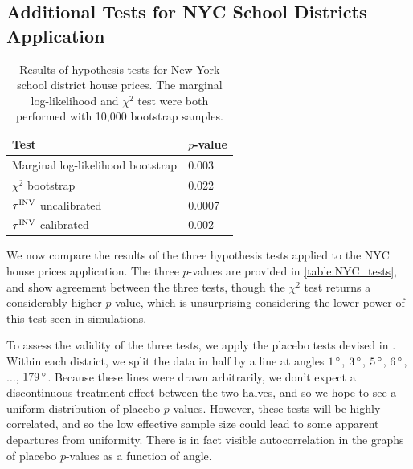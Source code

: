 \subsection{Additional Tests for NYC School Districts Application}
\label{sec:nyc_hypothesis_tests}

\begin{table}[tbp]
    \centering
    \bgroup
    \def\arraystretch{1.1}%
    \begin{tabular}{ll}
        \hline
        Test                   & \(p\)-value \\
        \hline
        Marginal log-likelihood bootstrap & 0.003     \\
        \(\chi^2\) bootstrap     & 0.022     \\
        \(\tau^{\mathrm{INV}}\) uncalibrated & 0.0007    \\
        \(\tau^{\mathrm{INV}}\) calibrated   & 0.002 \\
        \hline
    \end{tabular}
    \egroup
    \caption{
		Results of hypothesis tests for New York school district house prices.
		The marginal log-likelihood and \(\chi^2\) test were both performed with 10,000 bootstrap samples.
    	\label{table:NYC_tests}
	}
\end{table}

	We now compare the results of the three hypothesis tests applied to the NYC house prices application.
The three \(p\)-values are provided in \autoref{table:NYC_tests}, and show
agreement between the three tests, though the \(\chi^2\) test returns a considerably higher \(p\)-value, which is unsurprising considering the lower power of this test seen in simulations.

	To assess the validity of the three tests, we apply the placebo tests devised in .
Within each district, we split the data in half by a line at angles \(1{\,^\circ}\), \(3{\,^\circ}\), \(5{\,^\circ}\), \(6{\,^\circ}\), \(\dotsc\), \(179{\,^\circ}\).
Because these lines were drawn arbitrarily, we don't expect a discontinuous treatment effect between the two halves, and so we hope to see a uniform distribution of placebo \(p\)-values.
However, these tests will be highly correlated,
and so the low effective sample size could lead to some apparent departures from uniformity.
There is in fact visible autocorrelation in the graphs of placebo \(p\)-values as a function of angle.

